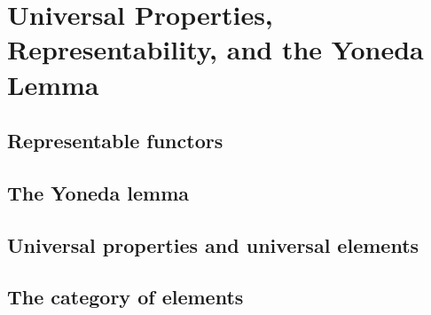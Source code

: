 \documentclass[main.tex]{subfiles}
\begin{document}
\chapter{Universal Properties, Representability, and the Yoneda Lemma}
\section{Representable functors}






\pagebreak
\section{The Yoneda lemma}







\pagebreak
\section{Universal properties and universal elements}




\pagebreak
\section{The category of elements}










\end{document}
